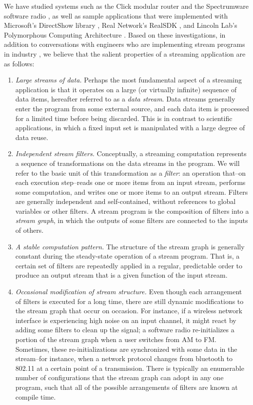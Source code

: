 We have studied systems such as the Click modular router \cite{click}
and the Spectrumware software radio
\cite{spectrumware, softwareradio}, as well as sample applications
that were implemented with Microsoft's DirectShow library
\cite{directshow}, Real Network's RealSDK
\cite{realsdk}, and Lincoln Lab's Polymorphous Computing Architecture
\cite{pca}.  Based on these investigations, in addition to conversations with engineers who are implementing stream programs in industry \cite{nokia, vanu}, we believe that the salient properties of a streaming application are as follows:
\begin{enumerate}
\item {\it Large streams of data.}  Perhaps the most fundamental
aspect of a streaming application is that it operates on a large (or
virtually infinite) sequence of data items, hereafter referred to as a
{\it data stream}.  Data streams generally enter the program from some
external source, and each data item is processed for a limited time
before being discarded.  This is in contrast to scientific
applications, in which a fixed input set is manipulated with a large
degree of data reuse.

\item {\it Independent stream filters.}  Conceptually, a streaming computation
represents a sequence of transformations on the data streams in the
program.  We will refer to the basic unit of this transformation as a
{\it filter}: an operation that--on each execution step--reads one or
more items from an input stream, performs some computation, and writes
one or more items to an output stream.  Filters are generally
independent and self-contained, without references to global variables
or other filters.  A stream program is the composition of filters into
a {\it stream graph}, in which the outputs of some filters are
connected to the inputs of others.

\item {\it A stable computation pattern.}  The structure of the stream
graph is generally constant during the steady-state operation of a
stream program.  That is, a certain set of filters are repeatedly
applied in a regular, predictable order to produce an output stream
that is a given function of the input stream.

\item {\it Occasional modification of stream structure.}  Even though each
arrangement of filters is executed for a long time, there are still
dynamic modifications to the stream graph that occur on occasion.  For
instance, if a wireless network interface is experiencing high noise
on an input channel, it might react by adding some filters to clean up
the signal; a software radio re-initializes a portion of the stream
graph when a user switches from AM to FM.  Sometimes, these
re-initializations are synchronized with some data in the stream--for
instance, when a network protocol changes from bluetooth to 802.11 at
a certain point of a transmission.  There is typically an enumerable
number of configurations that the stream graph can adopt in any one
program, such that all of the possible arrangements of filters are
known at compile time.


\end{enumerate}
